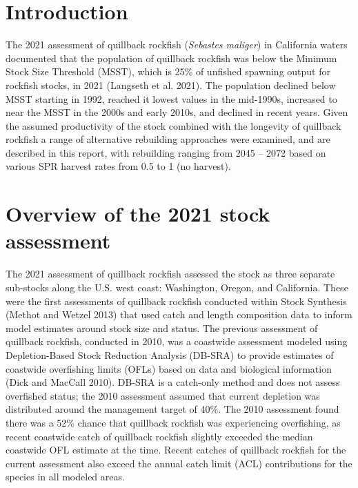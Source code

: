 \documentclass[11pt,
  letterpaper,
]{article}
\begin{document}
\pagebreak
\setlength{\parskip}{5mm plus1mm minus1mm}
\setcounter{page}{1}
\renewcommand{\thefigure}{\arabic{figure}}
\renewcommand{\thetable}{\arabic{table}}
\setcounter{table}{0}
\setcounter{figure}{0}

\setlength\parskip{0.2em plus 0.1em minus 0.2em}

\hypertarget{introduction}{%
\section{Introduction}\label{introduction}}

The 2021 assessment of quillback rockfish (\emph{Sebastes maliger}) in California waters documented that the population of quillback rockfish was below the Minimum Stock Size Threshold (MSST), which is 25\% of unfished spawning output for rockfish stocks, in 2021 (Langseth et al. 2021). The population declined below MSST starting in 1992, reached it lowest values in the mid-1990s, increased to near the MSST in the 2000s and early 2010s, and declined in recent years. Given the assumed productivity of the stock combined with the longevity of quillback rockfish a range of alternative rebuilding approaches were examined, and are described in this report, with rebuilding ranging from 2045 -- 2072 based on various SPR harvest rates from 0.5 to 1 (no harvest).

\hypertarget{overview-of-the-2021-stock-assessment}{%
\section{Overview of the 2021 stock assessment}\label{overview-of-the-2021-stock-assessment}}

The 2021 assessment of quillback rockfish assessed the stock as three separate sub-stocks along the U.S. west coast: Washington, Oregon, and California. These were the first assessments of quillback rockfish conducted within Stock Synthesis (Methot and Wetzel 2013) that used catch and length composition data to inform model estimates around stock size and status. The previous assessment of quillback rockfish, conducted in 2010, was a coastwide assessment modeled using Depletion-Based Stock Reduction Analysis (DB-SRA) to provide estimates of coastwide overfishing limits (OFLs) based on data and biological information (Dick and MacCall 2010). DB-SRA is a catch-only method and does not assess overfished status; the 2010 assessment assumed that current depletion was distributed around the management target of 40\%. The 2010 assessment found there was a 52\% chance that quillback rockfish was experiencing overfishing, as recent coastwide catch of quillback rockfish slightly exceeded the median coastwide OFL estimate at the time. Recent catches of quillback rockfish for the current assessment also exceed the annual catch limit (ACL) contributions for the species in all modeled areas.
\end{document}
